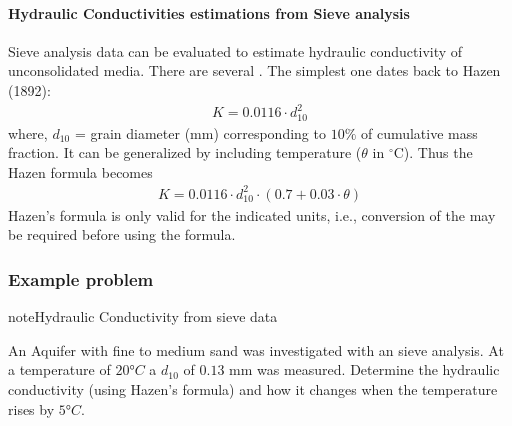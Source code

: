 \documentclass[letterpaper,10pt,english]{sphinxmanual}
\begin{document}
\paragraph{Hydraulic Conductivities estimations from Sieve analysis}
\label{\detokenize{contents/flow/lecture_04/14_darcy_law_K:hydraulic-conductivities-estimations-from-sieve-analysis}}
Sieve analysis data can be evaluated to estimate hydraulic conductivity of
unconsolidated media. There are several . The simplest one dates back to Hazen (1892):
\begin{equation*}
\begin{split}
K = 0.0116 \cdot d_{10}^2
\end{split}
\end{equation*}
where, \(d_{10}\) = grain diameter (mm) corresponding to \(10
\%\) of cumulative mass fraction. It can be generalized by including temperature (\(\theta\) in \(^\circ\)C). Thus the Hazen formula becomes
\begin{equation*}
\begin{split}
K = 0.0116 \cdot d_{10}^2 \cdot (0.7 + 0.03\cdot\theta)
\end{split}
\end{equation*}
Hazen’s formula is only valid for the indicated units, i.e., conversion of the  may be required before using the formula.


\subsubsection{Example problem}
\label{\detokenize{contents/flow/lecture_04/14_darcy_law_K:id2}}
\begin{sphinxadmonition}{note}{Hydraulic Conductivity from sieve data}

An Aquifer with fine to medium sand was investigated with an sieve analysis. At a temperature of \(20°C\) a \(d_{10}\) of \(0.13\) mm was measured. Determine the hydraulic conductivity (using Hazen’s formula) and how it changes when the temperature rises by \(5°C\).
\end{sphinxadmonition}
\end{document}
